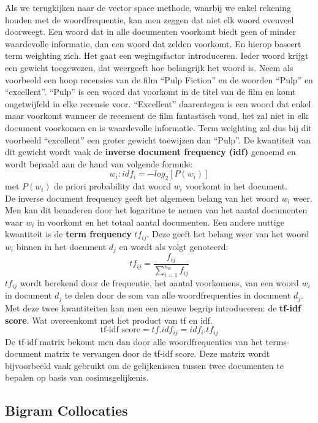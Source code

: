 Als we terugkijken naar de vector space methode, waarbij we enkel rekening houden met de woordfrequentie, kan men zeggen dat niet elk woord evenveel doorweegt. Een woord dat in alle documenten voorkomt biedt geen of minder waardevolle informatie, dan een woord dat zelden voorkomt. En hierop baseert term weighting zich. Het gaat een wegingsfactor introduceren. Ieder woord krijgt een gewicht toegewezen, dat weergeeft hoe belangrijk het woord is. Neem als voorbeeld een hoop recensies van de film ``Pulp Fiction'' en de woorden ``Pulp'' en ``excellent''. ``Pulp'' is een woord dat voorkomt in de titel van de film en komt ongetwijfeld in elke recensie voor. ``Excellent'' daarentegen is een woord dat enkel maar voorkomt wanneer de recensent de film fantastisch vond, het zal niet in elk document voorkomen en is waardevolle informatie. Term weighting zal dus bij dit voorbeeld ``excellent'' een groter gewicht toewijzen dan ``Pulp''. 
%
De kwantiteit van dit gewicht wordt vaak de \textbf{inverse document frequency  (idf)} genoemd en wordt bepaald aan de hand van volgende formule:
\[w_{i}: idf_{i} = -log_{2}[P(w_{i})] \]
met $P(w_{i})$ de priori probability dat woord $w_{i}$ voorkomt in het document.\\
%
De inverse document frequency geeft het algemeen belang van het woord $w_{i}$ weer. Men kan dit benaderen door het logaritme te nemen van het aantal documenten waar $w_{i}$ in voorkomt en het totaal aantal documenten.
Een andere nuttige kwantiteit is de  \textbf{term frequency} $tf_{ij}$. Deze geeft het belang weer van het woord $w_{i}$ binnen in het document $d_{j}$  en wordt als volgt genoteerd:
\[ tf_{ij} = \frac{f_{ij}}{ \sum_{i=1}^{n_{w}}f_{ij}} \]
%
$tf_{ij}$ wordt berekend door de frequentie, het aantal voorkomens, van een woord $w_{i}$ in document $d_{j}$ te delen door de som van alle woordfrequenties in document $d_{j}$.
Met deze twee kwantiteiten kan men een nieuwe begrip introduceren: de \textbf{tf-idf score}. Wat overeenkomt met het product van tf en idf.
\[ \text{tf-idf score} = tf . idf_{ij} = idf_{i} . tf_{ij} \]
%
De tf-idf matrix bekomt men dan door alle woordfrequenties van het terms-document matrix te vervangen door de tf-idf score.
Deze matrix wordt bijvoorbeeld vaak gebruikt om de gelijkenissen tussen twee documenten te bepalen op basis van cosinusgelijkenis.


\subsection{Bigram Collocaties}\label{Bigram Collocaties}

